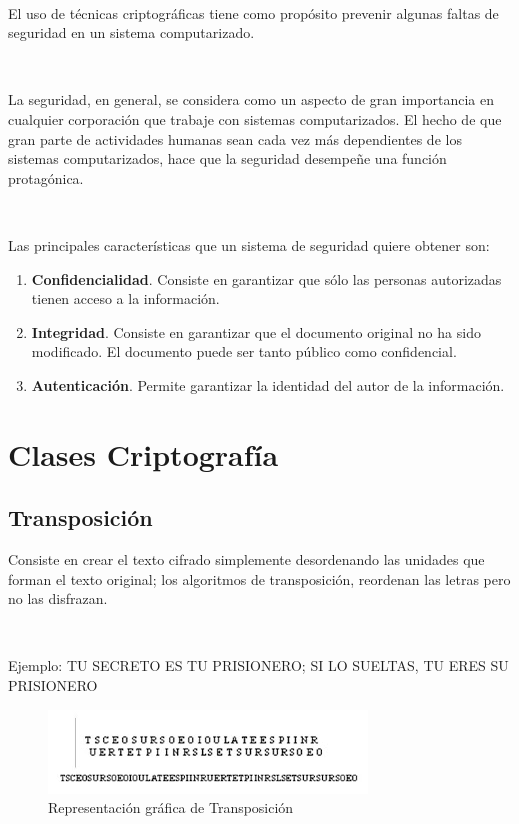 \documentclass[11pt, conference]{IEEEtran}
\begin{document}
\

El uso de técnicas criptográficas tiene como propósito prevenir algunas faltas de seguridad en un sistema computarizado.

\

La seguridad, en general, se considera como un aspecto de gran importancia en cualquier corporación que trabaje con sistemas computarizados. El hecho de que gran parte de actividades humanas sean cada vez más dependientes de los sistemas computarizados, hace que la seguridad desempeñe una función protagónica.\cite{d}

\

Las principales características que un sistema de seguridad quiere obtener son:

	\begin{enumerate}
		\item \textbf{Confidencialidad}. Consiste en garantizar que sólo las personas autorizadas tienen acceso a la información.
		\item \textbf{Integridad}. Consiste en garantizar que el documento original no ha sido modificado. El documento puede ser tanto público como confidencial.
		\item \textbf{Autenticación}. Permite garantizar la identidad del autor de la información. 
	\end{enumerate}

\section{Clases Criptografía}
\subsection{Transposición}
Consiste en crear el texto cifrado simplemente desordenando las unidades que forman el texto original; los algoritmos de transposición, reordenan las letras pero no las disfrazan.

\

Ejemplo:
TU SECRETO ES TU PRISIONERO; SI LO SUELTAS, TU ERES
SU PRISIONERO

\begin{figure}[h]
	\begin{center}
		\includegraphics[scale=0.7]{1.jpg}
		\caption{Representación gráfica de Transposición} 
	\end{center}
\end{figure}
\pagebreak
\end{document}
